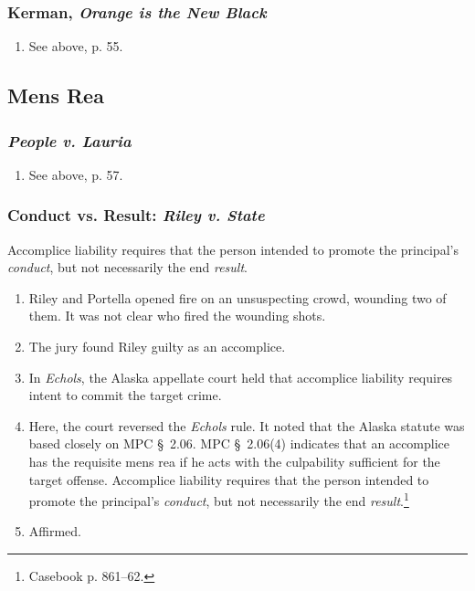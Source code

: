 \subsubsection{Kerman, \emph{Orange is the New Black}}

\begin{enumerate}
    \item See above, p. 55.
\end{enumerate}

\subsection{Mens Rea}

\subsubsection{\emph{People v. Lauria}}

\begin{enumerate}
    \item See above, p. 57.
\end{enumerate}

\subsubsection{Conduct vs. Result: \emph{Riley v. State}}

Accomplice liability requires that the person intended to promote the 
principal's \emph{conduct}, but not necessarily the end \emph{result}.

\begin{enumerate}
    \item Riley and Portella opened fire on an unsuspecting crowd, wounding 
    two of them. It was not clear who fired the wounding shots.
    \item The jury found Riley guilty as an accomplice.
    \item In \emph{Echols}, the Alaska appellate court held that accomplice 
    liability requires intent to commit the target crime.
    \item Here, the court reversed the \emph{Echols} rule. It noted that the 
    Alaska statute was based closely on MPC \S\ 2.06. MPC \S\ 2.06(4) 
    indicates that an accomplice has the requisite mens rea if he acts with 
    the culpability sufficient for the target offense. Accomplice liability 
    requires that the person intended to promote the principal's 
    \emph{conduct}, but not necessarily the end 
    \emph{result}.\footnote{Casebook p. 861--62.}
    \item Affirmed.
\end{enumerate}

